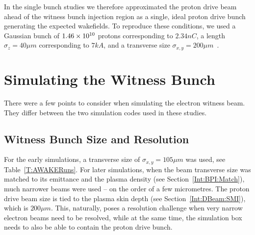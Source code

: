 In the single bunch studies we therefore approximated the proton drive beam ahead of the witness bunch injection region as a single, ideal proton drive bunch generating the expected wakefields.
To reproduce these conditions, we used a Gaussian bunch of $1.46\times 10^{10}$ protons corresponding to $2.34\unit{nC}$, a length $\sigma_{z} = 40\unit{\mu m}$ corresponding to $7\unit{kA}$, and a transverse size $\sigma_{x,y}=200\unit{\mu m}$~\cite{berglyd_olsen:2018}.


\section{Simulating the Witness Bunch}
\label{Sim:EBeam}

There were a few points to consider when simulating the electron witness beam.
They differ between the two simulation codes used in these studies.

\subsection{Witness Bunch Size and Resolution}
\label{Sim:EBeam:SizeRes}

For the early simulations, a transverse size of $\sigma_{x,y}=105\unit{\mu m}$ was used, see Table~\ref{T:AWAKERuns}.
For later simulations, when the beam transverse size was matched to its emittance and the plasma density (see Section~\ref{Int:BPI:Match}), much narrower beams were used -- on the order of a few micrometres.
The proton drive beam size is tied to the plasma skin depth (see Section~\ref{Int:DBeam:SMI}), which is $200\unit{\mu m}$.
This, naturally, poses a resolution challenge when very narrow electron beams need to be resolved, while at the same time, the simulation box needs to also be able to contain the proton drive bunch.

